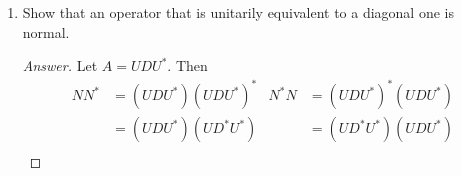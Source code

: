 \documentclass[../psets.tex]{subfiles}
\begin{document}
\begin{enumerate}[label={\textbf{2.\arabic*.}}]
\begin{proof}[Answer]
\begin{align*}
            &= N^*N
        \end{align*}
        Then we have
        \begin{align*}
            (N+M)(N+M)^* &=
            \begin{pmatrix}
                0 & 2\\
                0 & 0\\
            \end{pmatrix}
            \begin{pmatrix}
                0 & 0\\
                2 & 0\\
            \end{pmatrix}\\
            &=
            \begin{pmatrix}
                4 & 0\\
                0 & 0\\
            \end{pmatrix}\\
            &\neq
            \begin{pmatrix}
                0 & 0\\
                0 & 4\\
            \end{pmatrix}\\
            &=
            \begin{pmatrix}
                0 & 0\\
                2 & 0\\
            \end{pmatrix}
            \begin{pmatrix}
                0 & 2\\
                0 & 0\\
            \end{pmatrix}\\
            &= (N+M)^*(N+M)
        \end{align*}
    \end{proof}
    \item Show that an operator that is unitarily equivalent to a diagonal one is normal.
    \begin{proof}[Answer]
        Let $A=UDU^*$. Then
        \begin{align*}
            NN^* &= (UDU^*)(UDU^*)^*&
                N^*N &= (UDU^*)^*(UDU^*)\\
            &= (UDU^*)(UD^*U^*)&
                &= (UD^*U^*)(UDU^*)\\

\end{align*}
\end{proof}
\end{enumerate}
\end{document}
